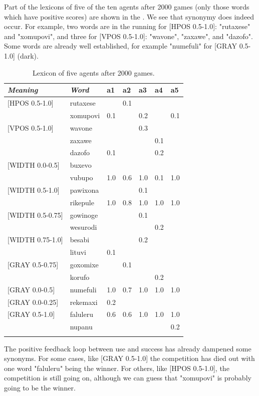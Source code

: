 Part of the lexicons of five of the ten agents after 2000 games 
(only those words which have positive scores) are shown in the 
. We see that synonymy does indeed occur. For
example, two words are in the 
running for [HPOS 0.5-1.0]: "rutaxese" and "xomupovi", and 
three for [VPOS 0.5-1.0]: "wavone", "zaxawe", and 
"dazofo". Some words are already well established, for
example "numefuli" for [GRAY 0.5-1.0] (dark). 
\begin{table}
\begin{center}
\begin{tabular}{ l  l  l  l  l  l  l  }
\lsptoprule
{\itshape Meaning}&{\itshape Word}&{\bfshape  a1}&{\bfshape  a2}&{\bfshape  a3}&{\bfshape  a4}&{\bfshape  a5} \\ \midrule
{}[HPOS 0.5-1.0]&rutaxese& &0.1& & &\\ 
 & xomupovi&0.1& &0.2& &0.1\\ 
{}[VPOS 0.5-1.0]&wavone& & &0.3& &\\ 
 & zaxawe& & & &0.1& \\ 
 & dazofo&0.1& & &0.2&\\ 
{}[WIDTH 0.0-0.5]&buxevo& & & & & \\ 
 & vubupo&1.0&0.6&1.0&0.1&1.0\\ 
{}[WIDTH 0.5-1.0]&pawixona& & &0.1& & \\ 
 & rikepule&1.0&0.8&1.0&1.0&1.0\\ 
{}[WIDTH 0.5-0.75]&gowinoge& & &0.1& &  \\ 
 & wesurodi& & & &0.2&\\ 
{}[WIDTH 0.75-1.0]&besabi& & &0.2& & \\ 
 & lituvi&0.1& & & & \\ 
{}[GRAY 0.5-0.75]&goxomixe& &0.1& & & \\ 
 & korufo& & & &0.2&\\ 
{}[GRAY 0.0-0.5]&numefuli&1.0&0.7&1.0&1.0&1.0\\ 
{}[GRAY 0.0-0.25]&rekemaxi&0.2& & & & \\ 
{}[GRAY 0.5-1.0]&faluleru&0.6&0.6&1.0&1.0&1.0\\ 
 & nupanu& & & & &0.2 \\ 
\lspbottomrule
\end{tabular}
\caption{\label{tab:lex2000} Lexicon of five agents after 2000 games.}
\end{center}
\end{table}

The positive feedback loop between use and success
has already dampened some synonyms. For some cases, like [GRAY 0.5-1.0] the competition has died out 
with one word "faluleru" being the winner. 
For others, like [HPOS 0.5-1.0], the competition 
is still going on, although we can guess
that "xomupovi" is probably going to be the winner. 

